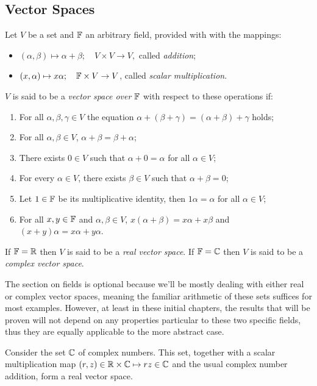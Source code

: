 \subsection{Vector Spaces}
\begin{definition}
	Let $V$ be a set and $\mathbb{F}$ an arbitrary field, provided with with the mappings:
	\begin{itemize}
		\item
			$(\alpha, \beta) \mapsto \alpha + \beta; \quad V \times V \to V,$ called \emph{addition};
		\item
			$(x, \alpha) \mapsto x\alpha; \quad \mathbb{F} \times V \to V$, called \emph{scalar multiplication}.
	\end{itemize}
	$V$ is said to be a \emph{vector space over $\mathbb{F}$} with respect to these operations if:
	\begin{enumerate}
		\item
			For all $\alpha, \beta, \gamma \in V$ the equation $\alpha + (\beta + \gamma) = (\alpha + \beta) + \gamma$ holds;
		\item
			For all $\alpha, \beta \in V$, $\alpha + \beta = \beta + \alpha$;
		\item
			There exists $0 \in V$ such that $\alpha + 0 = \alpha$ for all $\alpha \in V$;
		\item
			For every $\alpha \in V$, there exists $\beta \in V$ such that $\alpha + \beta = 0$;
		\item
			Let $1 \in \mathbb{F}$ be its multiplicative identity, then $1 \alpha = \alpha$ for all $\alpha \in V$;
		\item
			For all $x,y \in \mathbb{F}$ and $\alpha, \beta \in V$, $x(\alpha + \beta) = x\alpha + x\beta$ and $(x+y) \alpha = x \alpha + y \alpha$.
	\end{enumerate}
	If $\mathbb{F} = \mathbb{R}$ then $V$ is said to be a \emph{real vector space}. If $\mathbb{F} = \mathbb{C}$ then $V$ is said to be a \emph{complex vector space}. 
\end{definition}
The section on fields is optional because we'll be mostly dealing with either real or complex vector spaces, meaning the familiar arithmetic of these sets suffices for most examples. However, at least in these initial chapters, the results that will be proven will not depend on any properties particular to these two specific fields, thus they are equally applicable to the more abstract case.

\begin{example}
	Consider the set $\mathbb{C}$ of complex numbers. This set, together with a scalar multiplication map $(r, z) \in \mathbb{R} \times \mathbb{C} \mapsto rz \in \mathbb{C}$ and the usual complex number addition, form a real vector space.
\end{example}

